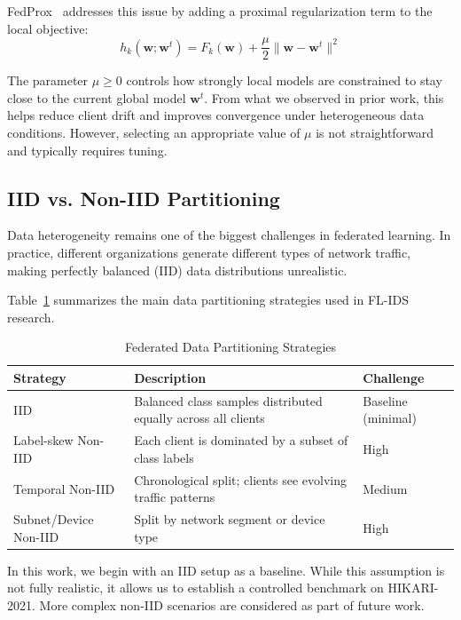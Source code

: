 \documentclass[conference]{IEEEtran}
\begin{document}
FedProx~\cite{li2020fedprox} addresses this issue by adding a proximal regularization term to the local objective:
\begin{equation}
    h_k(\mathbf{w}; \mathbf{w}^t) = F_k(\mathbf{w}) + \frac{\mu}{2} \|\mathbf{w} - \mathbf{w}^t\|^2
    \label{eq:fedprox}
\end{equation}

The parameter $\mu \geq 0$ controls how strongly local models are constrained to stay close to the current global model $\mathbf{w}^t$. From what we observed in prior work, this helps reduce client drift and improves convergence under heterogeneous data conditions. However, selecting an appropriate value of $\mu$ is not straightforward and typically requires tuning.

\subsection{IID vs. Non-IID Partitioning}

Data heterogeneity remains one of the biggest challenges in federated learning. In practice, different organizations generate different types of network traffic, making perfectly balanced (IID) data distributions unrealistic.

Table~\ref{tab:partition_strategies} summarizes the main data partitioning strategies used in FL-IDS research.

\begin{table}[t]
\centering
\caption{Federated Data Partitioning Strategies}
\label{tab:partition_strategies}
\setlength{\tabcolsep}{10pt}
\begin{tabular}{lp{7cm}l}
\hline
\textbf{Strategy} & \textbf{Description} & \textbf{Challenge} \\
\hline
IID                   & Balanced class samples distributed equally across all clients  & Baseline (minimal) \\
Label-skew Non-IID    & Each client is dominated by a subset of class labels           & High               \\
Temporal Non-IID      & Chronological split; clients see evolving traffic patterns     & Medium             \\
Subnet/Device Non-IID & Split by network segment or device type                        & High               \\
\hline
\end{tabular}
\end{table}

In this work, we begin with an IID setup as a baseline. While this assumption is not fully realistic, it allows us to establish a controlled benchmark on HIKARI-2021. More complex non-IID scenarios are considered as part of future work.
\end{document}
